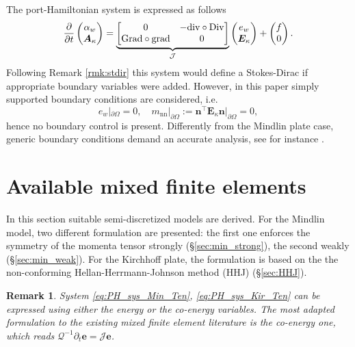 \documentclass{ifacconf}
\newtheorem{remark}{Remark}
\begin{document}
The port-Hamiltonian system is expressed as follows 
\begin{equation}
\label{eq:PH_sys_Kir_Ten}
\diffp{}{t}
\begin{pmatrix}
\alpha_w \\
\bm{A}_\kappa \\
\end{pmatrix} = 
\underbrace{\begin{bmatrix}
	0  & -\mathrm{div} \circ \mathrm{Div} \\
	\mathrm{Grad} \circ \mathrm{grad}  & 0 \\
	\end{bmatrix}}_{\mathcal{J}}
\begin{pmatrix}
e_w \\
\bm{E}_{\kappa} \\
\end{pmatrix}+ 
\begin{pmatrix}
f \\
0 \\
\end{pmatrix}.
\end{equation}
Following Remark \ref{rmk:stdir} this system would define a Stokes-Dirac if appropriate boundary variables were added. However, in this paper simply supported boundary conditions are considered, i.e.
\[
e_w|_{\partial \Omega} = 0, \quad m_{\text{nn}}|_{\partial \Omega}:= \bm{n}^\top \bm{E}_\kappa \bm{n}|_{\partial \Omega} = 0,
\]
hence no boundary control is present. Differently from the Mindlin plate case, generic boundary conditions demand an accurate analysis, see for instance \cite{Blum1990,mixed_kirchhoff}.

\section{Available mixed finite elements}
\label{sec:mixed}

In this section suitable semi-discretized models are derived. For the Mindlin model, two different formulation are presented: the first one enforces the symmetry of the momenta tensor strongly (\S\ref{sec:min_strong}), the second weakly (\S\ref{sec:min_weak}). For the Kirchhoff plate, the formulation is based on the the non-conforming Hellan-Herrmann-Johnson method (HHJ) (\S\ref{sec:HHJ}). 

\begin{remark}
System \eqref{eq:PH_sys_Min_Ten}, \eqref{eq:PH_sys_Kir_Ten} can be expressed using either the energy or the co-energy variables. The  most adapted formulation to the existing mixed finite element literature is the co-energy one, which reads $\mathcal{Q}^{-1} \partial_t \bm{e} = \mathcal{J} \bm{e}$.
\end{remark}
\end{document}
